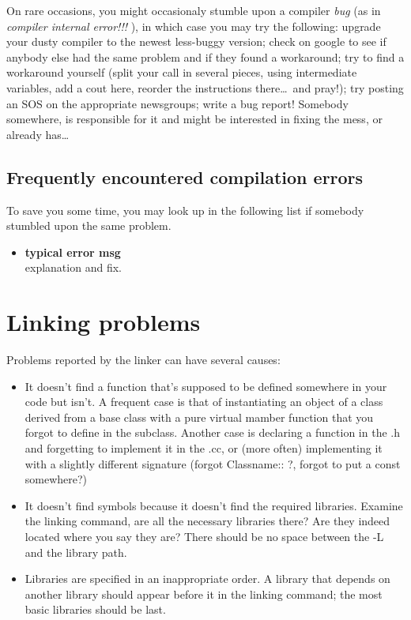 \documentclass[11pt]{book}
\begin{document}
 On rare occasions, you might occasionaly stumble upon a compiler
{\em bug} (as in {\em compiler internal error!!!} ), in which case
you may try the following: upgrade your dusty compiler to the newest
less-buggy version; check on google to see if anybody else had the
same problem and if they found a workaround; try to find a workaround
yourself (split your call in several pieces, using intermediate
variables, add a cout here, reorder the instructions there\ldots\ 
and pray!); try posting an SOS on the appropriate newsgroups; write
a bug report! Somebody somewhere, is responsible for it and might be
interested in fixing the mess, or already has\ldots


\subsection{Frequently encountered compilation errors}

To save you some time, you may look up in the following list if
somebody stumbled upon the same problem.

\begin{itemize}

\item {\bf typical error msg } \\
explanation and fix.

\end{itemize}



\section{Linking problems}

Problems reported by the linker can have several causes:

\begin{itemize}
\item It doesn't find a function that's supposed to be defined somewhere in
  your code but isn't.  A frequent case is that of instantiating an object
  of a class derived from a base class with a pure virtual mamber function
  that you forgot to define in the subclass. Another case is declaring a
  function in the .h and forgetting to implement it in the .cc, or (more
  often) implementing it with a slightly different signature (forgot
  Classname:: ?, forgot to put a const somewhere?)
\item It doesn't find symbols because it doesn't find the required
  libraries. Examine the linking command, are all the necessary libraries there? Are they
  indeed located where you say they are? There should be no space between the
  -L and the library path.
\item Libraries are specified in an inappropriate order. A library that
  depends on another library should appear before it in the linking
  command; the most basic libraries should be last.
\end{itemize}
\end{document}
